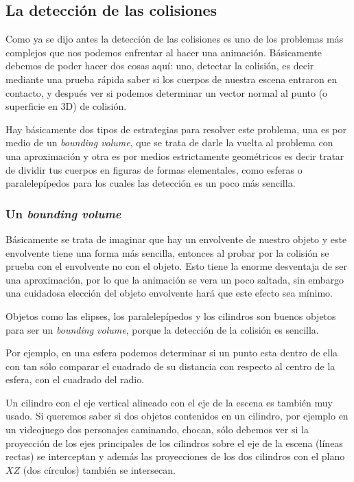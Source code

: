 \subsection{La detección de las colisiones}
Como ya se dijo antes la detección de las colisiones es uno de los problemas más complejos que nos podemos enfrentar al hacer una animación.
Básicamente debemos de poder hacer dos cosas aquí: uno, detectar la colisión, es decir mediante una prueba rápida saber si los cuerpos de nuestra escena entraron en contacto, y después ver si podemos determinar un vector normal al punto (o superficie en 3D) de colisión.

Hay básicamente dos tipos de estrategias para resolver este problema, una es por medio de un \foreignlanguage{english}{\emph{bounding volume}}, que se trata de darle la vuelta al problema con una aproximación y otra es por medios estrictamente geométricos es decir tratar de dividir tus cuerpos en figuras de formas elementales, como esferas o paralelepípedos para los cuales las detección es un poco más sencilla.

\subsubsection{Un \foreignlanguage{english}{\emph{bounding volume}}}
Básicamente se trata de imaginar que hay un envolvente de nuestro objeto y este envolvente tiene una forma más sencilla, entonces al probar por la colisión se prueba con el envolvente no con el objeto.
Esto tiene la enorme desventaja de ser una aproximación, por lo que la animación se vera un poco saltada, sin embargo una cuidadosa elección del objeto envolvente hará que este efecto sea mínimo.

Objetos como las elipses, los paralelepípedos y los cilindros son buenos objetos para ser un \foreignlanguage{english}{\emph{bounding volume}}, porque la detección de la colisión es sencilla.

Por ejemplo, en una esfera podemos determinar si un punto esta dentro de ella con tan sólo comparar el cuadrado de su distancia con respecto al centro de la esfera, con el cuadrado del radio. 

Un cilindro con el eje vertical alineado con el eje de la escena es también muy usado.
Si queremos saber si dos objetos contenidos en un cilindro, por ejemplo en un videojuego dos personajes caminando, chocan, sólo debemos ver si la proyección de los ejes principales de los cilindros sobre el eje de la escena (líneas rectas) se interceptan y además las proyecciones de los dos cilindros con el plano $XZ$ (dos círculos) también se intersecan.


